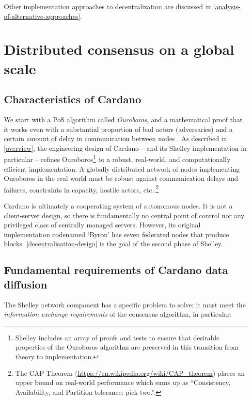 \documentclass[11pt,a4paper]{article}
\begin{document}
Other implementation approaches to decentralization are discussed in
\cref{analysis-of-alternative-approaches}.

\section{Distributed consensus on a global scale}
\label{distributed-consensus-on-a-global-scale}

\subsection{Characteristics of Cardano}
\label{characteristics-of-cardano}

We start with a PoS algorithm called \emph{Ouroboros}, and a
mathematical proof that it works even with a substantial proportion of
bad actors (adversaries) and a certain amount of delay in communication
between nodes \cite{BGKR17}. As described in
\cref{overview}, the engineering design of
Cardano -- and its Shelley implementation in particular -- refines
Ouroboros\footnote{Shelley includes an array of proofs and tests to
  ensure that desirable properties of the Ouroboros algorithm are
  preserved in this transition from theory to implementation.} to a
robust, real-world, and computationally efficient implementation. A
globally distributed network of nodes implementing Ouroboros in the real
world must be robust against communication delays and failures,
constraints in capacity, hostile actors, etc..\footnote{The CAP Theorem
  (\href{https://en.wikipedia.org/wiki/CAP_theorem}{{https://en.wikipedia.org/wiki/CAP\_theorem}})
  places an upper bound on real-world performance which sums up as
  ``Consistency, Availability, and Partition-tolerance: pick two.''.}

Cardano is ultimately a cooperating system of autonomous nodes. It is
not a client-server design, so there is fundamentally no central point
of control nor any privileged class of centrally managed servers.
However, its original implementation codenamed `Byron' has seven
federated nodes that produce blocks.
\cref{decentralisation-design} is
the goal of the second phase of Shelley.

\subsection{Fundamental requirements of Cardano data diffusion}
\label{fundamental-requirements-of-cardano-data-diffusion}

The Shelley network component has a specific problem to solve: it must
meet the \emph{information exchange requirements} of the consensus
algorithm, in particular:
\end{document}
